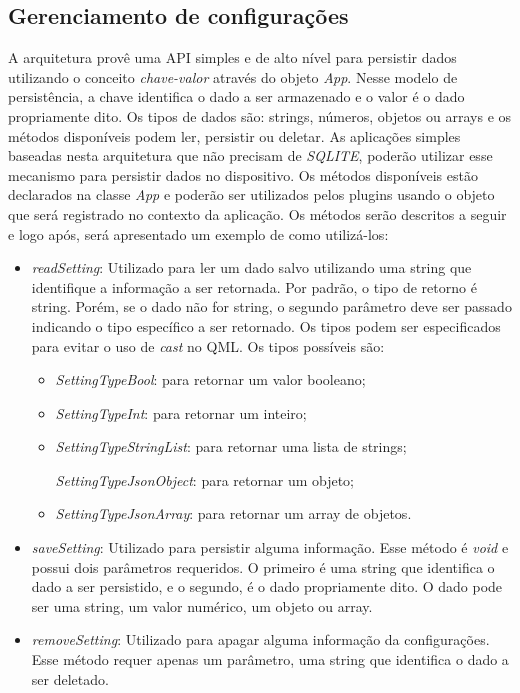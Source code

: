 \subsection{Gerenciamento de configurações}
A arquitetura provê uma API simples e de alto nível para persistir dados utilizando o conceito \textit{chave-valor} através do objeto \textit{App}. Nesse modelo de persistência, a chave identifica o dado a ser armazenado e o valor é o dado propriamente dito. Os tipos de dados são: strings, números, objetos ou arrays e os métodos disponíveis podem ler, persistir ou deletar. As aplicações simples baseadas nesta arquitetura que não precisam de \textit{SQLITE}, poderão utilizar esse mecanismo para persistir dados no dispositivo. Os métodos disponíveis estão declarados na classe \textit{App} e poderão ser utilizados pelos plugins usando o objeto que será registrado no contexto da aplicação. Os métodos serão descritos a seguir e logo após, será apresentado um exemplo de como utilizá-los:
	\begin{itemize}
		\item \textit{readSetting}: Utilizado para ler um dado salvo utilizando uma string que identifique a informação a ser retornada. Por padrão, o tipo de retorno é string. Porém, se o dado não for string, o segundo parâmetro deve ser passado indicando o tipo específico a ser retornado. Os tipos podem ser especificados para evitar o uso de \textit{cast} no QML. Os tipos possíveis são:
		\begin{itemize}
			\item \textit{SettingTypeBool}: para retornar um valor booleano;

			\item \textit{SettingTypeInt}: para retornar um inteiro;

			\item \textit{SettingTypeStringList}: para retornar uma lista de strings;

			\textit{SettingTypeJsonObject}: para retornar um objeto;

			\item \textit{SettingTypeJsonArray}: para retornar um array de objetos.
		\end{itemize}

		\item \textit{saveSetting}: Utilizado para persistir alguma informação. Esse método é \textit{void} e possui dois parâmetros requeridos. O primeiro é uma string que identifica o dado a ser persistido, e o segundo, é o dado propriamente dito. O dado pode ser uma string, um valor numérico, um objeto ou array.

		\item \textit{removeSetting}: Utilizado para apagar alguma informação da configurações. Esse método requer apenas um parâmetro, uma string que identifica o dado a ser deletado.
	\end{itemize}

